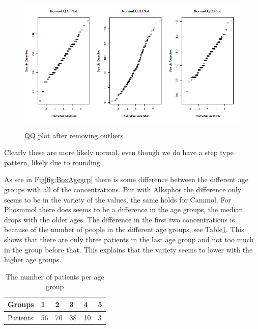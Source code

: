 \documentclass{article}
\begin{document}
	\begin{figure}[H]
		\centering
		{\includegraphics[scale=0.3]{../results/dat2_qq.png}}
		\caption{QQ plot after removing outliers}
		\label{fig:qq2}
	\end{figure}
	
	Clearly these are more likely normal, even though we do have a step type pattern, likely due to rounding.
	
      As see in Fig\ref{fig:BoxAgegrp} there is some difference between the different age groups with all of the concentrations.
      But with Alksphos the difference only seems to be in the variety of the values, the same holds for Cammol.
      For Phosmmol there does seems to be a difference in the age groups, the median drops with the older ages.
      The difference in the first two concentrations is because of the number of people in the different age groups, see Table\ref{table:Agegrp}.
      This shows that there are only three patients in the last age group and not too much in the group before that.
      This explains that the variety seems to lower with the higher age groups.
      
      \begin{table}[H]
        \begin{center}
          \scriptsize
          \begin{tabular}{|l|lllll|}
          \hline
          Groups&1&2&3&4&5\\
          \hline
          Patients&56&70&38&10&3\\
          \hline
          \end{tabular}
        \end{center}
        \caption{The number of patients per age group}
        \label{table:Agegrp}
      \end{table}
\end{document}
